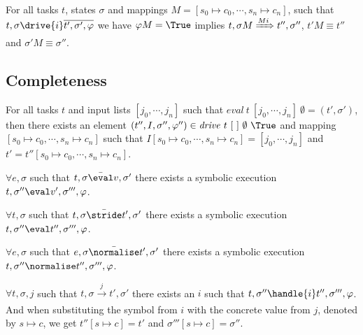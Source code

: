 \begin{lemma}
  \label{lem:sounddrive}

  For all tasks $t$, states $\sigma$ and mappings $M=[s_0\mapsto c_0,\cdots,s_n\mapsto c_n]$,
  such that $t,\sigma\drive{i} \overline{t',\sigma',\phi}$
  we have $\phi M = \True$ implies
  $t,\sigma M \xRightarrow[]{M i} t'',\sigma''$, $t'M \equiv t''$ and $\sigma' M \equiv \sigma''$.
\end{lemma}



\subsection{Completeness}



\begin{theorem}
For all tasks $t$ and input lists $[j_0,\cdots,j_n]$ such that $\mathit{eval}\ t\ [j_0,\cdots,j_n]\ \emptyset = (t',\sigma')$,
then there exists an element $(t'',I,\sigma'',\phi'')\in \mathit{drive}\ t\ [\ ]\ \emptyset\ \True$ and mapping $[s_0\mapsto c_0,\cdots,s_n\mapsto c_n]$ such that
$I[s_0\mapsto c_0,\cdots,s_n\mapsto c_n]=[j_0,\cdots,j_n]$ and $t'=t''[s_0\mapsto c_0,\cdots,s_n\mapsto c_n]$.
  \label{thm:complete}
\end{theorem}


\begin{lemma}
  \label{lem:completeEval}
  $\forall e,\sigma$ such that $t,\sigma \bar{\eval}v,\sigma'$
  there exists a symbolic execution $t,\sigma''\eval v',\sigma''',\phi$.
\end{lemma}


\begin{lemma}
  \label{lem:completeStride}
  $\forall t,\sigma$ such that $t,\sigma \bar{\stride}t',\sigma'$
  there exists a symbolic execution $t,\sigma''\eval t'',\sigma''',\phi$.
\end{lemma}


\begin{lemma}
  \label{lem:completeNormalise}
  $\forall e,\sigma$ such that $e,\sigma \bar{\normalise}t',\sigma'$
  there exists a symbolic execution $t,\sigma''\normalise t'',\sigma''',\phi$.
\end{lemma}


\begin{lemma}
  \label{lem:completeHandle}
  $\forall t,\sigma,j$ such that $t,\sigma \xrightarrow[]{j} t',\sigma'$
  there exists an $i$ such that $t,\sigma''\handle{i} t'',\sigma''',\phi$.
  And when substituting the symbol from $i$ with the concrete value from $j$,
  denoted by $s\mapsto c$, we get $t''[s\mapsto c]= t'$ and $\sigma'''[s\mapsto c]=\sigma''$.
\end{lemma}



